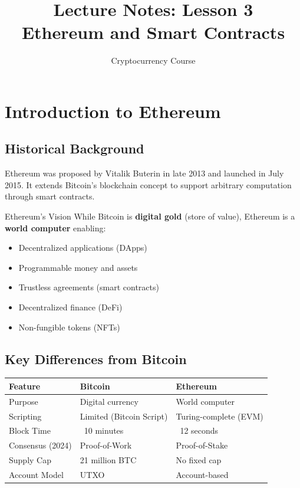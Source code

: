\documentclass[11pt,a4paper]{article}
\title{\textbf{Lecture Notes: Lesson 3}\\Ethereum and Smart Contracts}
\author{Cryptocurrency Course}
\date{}
\begin{document}
\maketitle

\tableofcontents
\newpage

\section{Introduction to Ethereum}

\subsection{Historical Background}

Ethereum was proposed by Vitalik Buterin in late 2013 and launched in July 2015. It extends Bitcoin's blockchain concept to support arbitrary computation through smart contracts.

\begin{keybox}{Ethereum's Vision}
While Bitcoin is \textbf{digital gold} (store of value), Ethereum is a \textbf{world computer} enabling:
\begin{itemize}
  \item Decentralized applications (DApps)
  \item Programmable money and assets
  \item Trustless agreements (smart contracts)
  \item Decentralized finance (DeFi)
  \item Non-fungible tokens (NFTs)
\end{itemize}
\end{keybox}

\subsection{Key Differences from Bitcoin}

\begin{center}
\begin{tabular}{|l|l|l|}
\hline
\textbf{Feature} & \textbf{Bitcoin} & \textbf{Ethereum} \\
\hline
Purpose & Digital currency & World computer \\
Scripting & Limited (Bitcoin Script) & Turing-complete (EVM) \\
Block Time & ~10 minutes & ~12 seconds \\
Consensus (2024) & Proof-of-Work & Proof-of-Stake \\
Supply Cap & 21 million BTC & No fixed cap \\
Account Model & UTXO & Account-based \\
\hline
\end{tabular}
\end{center}
\end{document}
